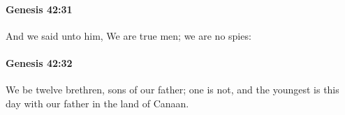		\paragraph{Genesis 42:31} %
			\label{GENESIS-42-31}

			And we said unto him, We are true men; we are no spies:


		\paragraph{Genesis 42:32} %
			\label{GENESIS-42-32}

			We be twelve brethren, sons of our father; one is not, and the youngest is this day with our father in the land of Canaan.



